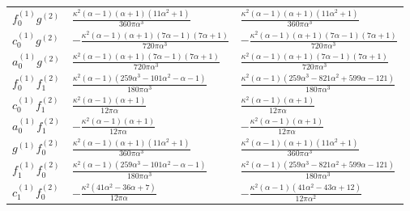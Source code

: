 {\begin{longtable}{lll}
$f_0^{(1)} g^{(2)}$ & $\frac{\kappa^{2} \left(\alpha - 1\right) \left(\alpha + 1\right) \left(11 \alpha^{2} + 1\right)}{360 \pi \alpha^{3}}$ & $\frac{\kappa^{2} \left(\alpha - 1\right) \left(\alpha + 1\right) \left(11 \alpha^{2} + 1\right)}{360 \pi \alpha^{3}}$\\
$c_0^{(1)} g^{(2)}$ & $- \frac{\kappa^{2} \left(\alpha - 1\right) \left(\alpha + 1\right) \left(7 \alpha - 1\right) \left(7 \alpha + 1\right)}{720 \pi \alpha^{3}}$ & $- \frac{\kappa^{2} \left(\alpha - 1\right) \left(\alpha + 1\right) \left(7 \alpha - 1\right) \left(7 \alpha + 1\right)}{720 \pi \alpha^{3}}$\\
$a_0^{(1)} g^{(2)}$ & $\frac{\kappa^{2} \left(\alpha - 1\right) \left(\alpha + 1\right) \left(7 \alpha - 1\right) \left(7 \alpha + 1\right)}{720 \pi \alpha^{3}}$ & $\frac{\kappa^{2} \left(\alpha - 1\right) \left(\alpha + 1\right) \left(7 \alpha - 1\right) \left(7 \alpha + 1\right)}{720 \pi \alpha^{3}}$\\
$f_0^{(1)} f_1^{(2)}$ & $\frac{\kappa^{2} \left(\alpha - 1\right) \left(259 \alpha^{3} - 101 \alpha^{2} - \alpha - 1\right)}{180 \pi \alpha^{3}}$ & $\frac{\kappa^{2} \left(\alpha - 1\right) \left(259 \alpha^{3} - 821 \alpha^{2} + 599 \alpha - 121\right)}{180 \pi \alpha^{3}}$\\
$c_0^{(1)} f_1^{(2)}$ & $\frac{\kappa^{2} \left(\alpha - 1\right) \left(\alpha + 1\right)}{12 \pi \alpha}$ & $\frac{\kappa^{2} \left(\alpha - 1\right) \left(\alpha + 1\right)}{12 \pi \alpha}$\\
$a_0^{(1)} f_1^{(2)}$ & $- \frac{\kappa^{2} \left(\alpha - 1\right) \left(\alpha + 1\right)}{12 \pi \alpha}$ & $- \frac{\kappa^{2} \left(\alpha - 1\right) \left(\alpha + 1\right)}{12 \pi \alpha}$\\
$g^{(1)} f_0^{(2)}$ & $\frac{\kappa^{2} \left(\alpha - 1\right) \left(\alpha + 1\right) \left(11 \alpha^{2} + 1\right)}{360 \pi \alpha^{3}}$ & $\frac{\kappa^{2} \left(\alpha - 1\right) \left(\alpha + 1\right) \left(11 \alpha^{2} + 1\right)}{360 \pi \alpha^{3}}$\\
$f_1^{(1)} f_0^{(2)}$ & $\frac{\kappa^{2} \left(\alpha - 1\right) \left(259 \alpha^{3} - 101 \alpha^{2} - \alpha - 1\right)}{180 \pi \alpha^{3}}$ & $\frac{\kappa^{2} \left(\alpha - 1\right) \left(259 \alpha^{3} - 821 \alpha^{2} + 599 \alpha - 121\right)}{180 \pi \alpha^{3}}$\\
$c_1^{(1)} f_0^{(2)}$ & $- \frac{\kappa^{2} \left(41 \alpha^{2} - 36 \alpha + 7\right)}{12 \pi \alpha}$ & $- \frac{\kappa^{2} \left(\alpha - 1\right) \left(41 \alpha^{2} - 43 \alpha + 12\right)}{12 \pi \alpha^{2}}$\\

\end{longtable}}
